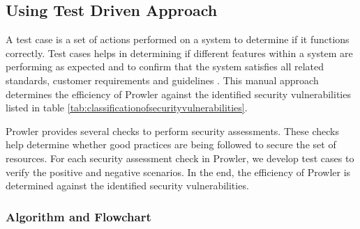 \subsection{Using Test Driven Approach}

\par A test case is a set of actions performed on a system to determine if it functions correctly. Test cases helps
in determining if different features within a system are performing as expected and to confirm that the system
satisfies all related standards, customer requirements and guidelines \cite{86}. This manual approach determines the
efficiency of Prowler against the identified security vulnerabilities listed in table \ref{tab:classificationofsecurityvulnerabilities}.

\par Prowler provides several checks to perform security assessments. These checks help determine whether good practices are being followed to secure the set of resources. For each security assessment check in Prowler, we develop test cases to verify the positive and negative scenarios. In the end, the efficiency of Prowler is determined against the identified security vulnerabilities.

\subsubsection{Algorithm and Flowchart}

